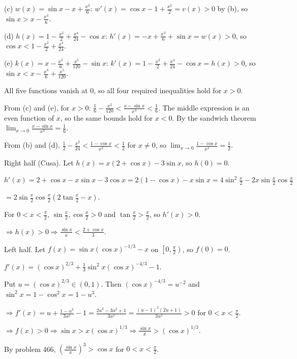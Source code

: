   (c) $w(x) = \sin x - x + \frac{x^3}{6}$: $w'(x) = \cos x - 1 + \frac{x^2}{2} = v(x) > 0$ by (b), so $\sin
  x > x - \frac{x^3}{6}$.

  (d) $h(x) = 1 - \frac{x^2}{2} + \frac{x^4}{24} - \cos x$: $h'(x) = -x + \frac{x^3}{6} + \sin x = w(x) > 0$,
  so $\cos x < 1 - \frac{x^2}{2} + \frac{x^4}{24}$.

  (e) $k(x) = x - \frac{x^3}{6} + \frac{x^5}{120} - \sin x$: $k'(x) = 1 - \frac{x^2}{2} + \frac{x^4}{24} -
  \cos x = h(x) > 0$, so $\sin x < x - \frac{x^3}{6} + \frac{x^5}{120}$.

  All five functions vanish at $0$, so all four required inequalities hold for $x > 0$.

  From (c) and (e), for $x > 0$: $\frac{1}{6} - \frac{x^2}{120} < \frac{x - \sin x}{x^3} < \frac{1}{6}$. The
  middle expression is an even function of $x$, so the same bounds hold for $x < 0$. By the sandwich
  theorem $\displaystyle\lim_{x\to 0}\frac{x - \sin x}{x^3} = \frac{1}{6}$.

  From (b) and (d), $\frac{1}{2} - \frac{x^2}{24} < \frac{1 - \cos x}{x^2} < \frac{1}{2}$ for $x\neq 0$, so
  $\displaystyle\lim_{x\to 0}\frac{1 - \cos x}{x^2} = \frac{1}{2}$.
\item Right half (Cusa). Let $h(x) = x(2 + \cos x) - 3\sin x$, so $h(0) = 0$.

  $h'(x) = 2 + \cos x - x\sin x - 3\cos x = 2(1 - \cos x) - x\sin x = 4\sin^2\frac{x}{2} -
  2x\sin\frac{x}{2}\cos\frac{x}{2}$

  $= 2\sin\frac{x}{2}\cos\frac{x}{2}\left(2\tan\frac{x}{2} - x\right)$.

  For $0 < x < \frac{\pi}{2}$, $\sin\frac{x}{2}, \cos\frac{x}{2} > 0$ and $\tan\frac{x}{2} > \frac{x}{2}$, so
  $h'(x) > 0$.

  $\Rightarrow h(x) > 0\Rightarrow\frac{\sin x}{x} < \frac{2 + \cos x}{3}$.

  Left half. Let $f(x) = \sin x(\cos x)^{-1/3} - x$ on $\left[0, \frac{\pi}{2}\right)$, so $f(0) = 0$.

  $f'(x) = (\cos x)^{2/3} + \frac{1}{3}\sin^2x(\cos x)^{-4/3} - 1$.

  Put $u = (\cos x)^{2/3}\in(0, 1)$. Then $(\cos x)^{-4/3} = u^{-2}$ and $\sin^2x = 1 - \cos^2x = 1 - u^3$.

  $\Rightarrow f'(x) = u + \frac{1 - u^3}{3u^2} - 1 = \frac{2u^3 - 3u^2 + 1}{3u^2} = \frac{(u - 1)^2(2u +
    1)}{3u^2} > 0$ for $0 < x < \frac{\pi}{2}$.

  $\Rightarrow f(x) > 0\Rightarrow\sin x > x(\cos x)^{1/3}\Rightarrow\frac{\sin x}{x} > (\cos x)^{1/3}$.
\item By problem 466, $\left(\frac{\sin x}{x}\right)^3 > \cos x$ for $0 < x < \frac{\pi}{2}$.

